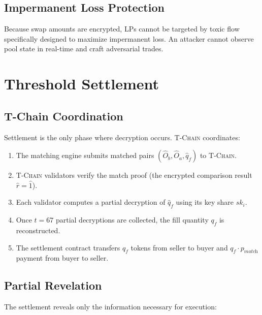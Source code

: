 \documentclass[11pt,letterpaper]{article}
\theoremstyle{definition}
\theoremstyle{remark}
\newcommand{\TChain}{\textsc{T-Chain}}
\begin{document}
\subsection{Impermanent Loss Protection}

Because swap amounts are encrypted, LPs cannot be targeted by toxic flow specifically designed to maximize impermanent loss. An attacker cannot observe pool state in real-time and craft adversarial trades.

\section{Threshold Settlement}
\label{sec:settlement}

\subsection{T-Chain Coordination}

Settlement is the only phase where decryption occurs. \TChain{} coordinates:

\begin{enumerate}
    \item The matching engine submits matched pairs $(\hat{O}_b, \hat{O}_a, \hat{q}_f)$ to \TChain{}.
    \item \TChain{} validators verify the match proof (the encrypted comparison result $\hat{r} = \hat{1}$).
    \item Each validator computes a partial decryption of $\hat{q}_f$ using its key share $sk_i$.
    \item Once $t = 67$ partial decryptions are collected, the fill quantity $q_f$ is reconstructed.
    \item The settlement contract transfers $q_f$ tokens from seller to buyer and $q_f \cdot p_{\textit{match}}$ payment from buyer to seller.
\end{enumerate}

\subsection{Partial Revelation}

The settlement reveals only the information necessary for execution:
\end{document}
